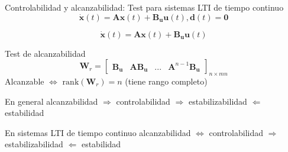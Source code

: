 \documentclass{beamer}
\begin{document}
\begin{frame}{Controlabilidad y alcanzabilidad: Test para sistemas LTI de tiempo continuo}
    $$\dot{\mathbf{x}}(t)=\mathbf{A}\mathbf{x}(t) + \mathbf{B_u}\mathbf{u}(t), \mathbf{d}(t) = \mathbf{0}$$

    $$\dot{\mathbf{x}}(t)=\mathbf{A}\mathbf{x}(t) + \mathbf{B_u}\mathbf{u}(t)$$
    
    \begin{block}{Test de alcanzabilidad}
        $$\mathbf{W}_r = \begin{bmatrix}
            \mathbf{B_u} & \mathbf{A}\mathbf{B_u} & ... & \mathbf{A}^{n-1} \mathbf{B_u}
        \end{bmatrix}_{n \times mn}$$
        Alcanzable $\iff$ $\mathrm{rank}(\mathbf{W}_r)=n$ (tiene rango completo)
    \end{block}

    \begin{block}{En general}
        alcanzabilidad $\Rightarrow$ controlabilidad $\Rightarrow$ estabilizabilidad $\Leftarrow$ estabilidad
    \end{block}

    
    \begin{block}{En sistemas LTI de tiempo continuo}
        alcanzabilidad $\iff$ controlabilidad $\Rightarrow$ estabilizabilidad $\Leftarrow$ estabilidad
    \end{block}
    
\end{frame}
\end{document}
